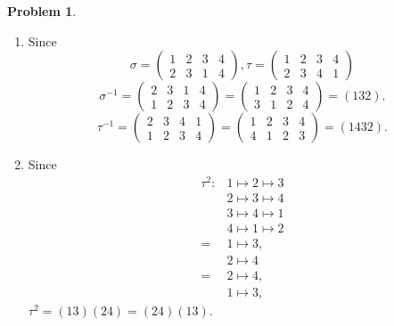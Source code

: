 \documentclass[a4paper, 12pt, fleqn, openany]{article}
\theoremstyle{definition}
\newtheorem{prb}{Problem}
\begin{document}
\begin{prb}
\begin{enumerate}
        \item Since
            \[
                \sigma = \left(
                \begin{array}{cccc}
                    1 & 2 & 3 & 4\\
                    2 & 3 & 1 & 4
                \end{array}
                \right),
                \tau = \left(
                \begin{array}{cccc}
                    1 & 2 & 3 & 4\\
                    2 & 3 & 4 & 1
                \end{array}
                \right)
            \]
            \[
                \sigma ^{-1} = \left(
                    \begin{array}{cccc}
                        2 & 3 & 1 & 4\\
                        1 & 2 & 3 & 4
                    \end{array}
                    \right)
                    = \left(
                    \begin{array}{cccc}
                        1 & 2 & 3 & 4\\
                        3 & 1 & 2 & 4
                    \end{array}
                    \right)=(132).
            \]
            \[
                \tau ^{-1} = \left(
                    \begin{array}{cccc}
                        2 & 3 & 4 & 1\\
                        1 & 2 & 3 & 4
                    \end{array}
                    \right)
                    = \left(
                    \begin{array}{cccc}
                        1 & 2 & 3 & 4\\
                        4 & 1 & 2 & 3
                    \end{array}
                    \right)=(1432).
            \]

        \item
            Since
            \begin{align*}
               \tau ^2 :& 1 \mapsto 2 \mapsto 3\\
                        & 2 \mapsto 3 \mapsto 4\\
                        & 3 \mapsto 4 \mapsto 1\\
                        & 4 \mapsto 1 \mapsto 2\\
                        =&1 \mapsto 3,\\
                        &2 \mapsto 4\\
                        =&2 \mapsto 4,\\
                        &1 \mapsto 3,
            \end{align*}
            $\tau ^2 = (13)(24) = (24)(13)$.


\end{enumerate}
\end{prb}
\end{document}
